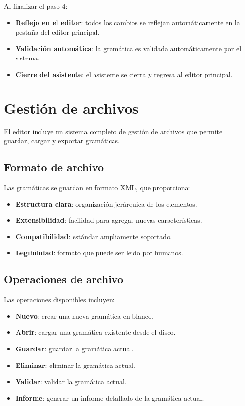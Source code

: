 Al finalizar el paso 4:

\begin{itemize}
    \item \textbf{Reflejo en el editor}: todos los cambios se reflejan automáticamente en la pestaña del editor principal.
    \item \textbf{Validación automática}: la gramática es validada automáticamente por el sistema.
    \item \textbf{Cierre del asistente}: el asistente se cierra y regresa al editor principal.
\end{itemize}

\section{Gestión de archivos}

El editor incluye un sistema completo de gestión de archivos que permite guardar, cargar y exportar gramáticas.

\subsection{Formato de archivo}

Las gramáticas se guardan en formato XML, que proporciona:

\begin{itemize}
    \item \textbf{Estructura clara}: organización jerárquica de los elementos.
    \item \textbf{Extensibilidad}: facilidad para agregar nuevas características.
    \item \textbf{Compatibilidad}: estándar ampliamente soportado.
    \item \textbf{Legibilidad}: formato que puede ser leído por humanos.
\end{itemize}

\subsection{Operaciones de archivo}

Las operaciones disponibles incluyen:

\begin{itemize}
    \item \textbf{Nuevo}: crear una nueva gramática en blanco.
    \item \textbf{Abrir}: cargar una gramática existente desde el disco.
    \item \textbf{Guardar}: guardar la gramática actual.
    \item \textbf{Eliminar}: eliminar la gramática actual.
    \item \textbf{Validar}: validar la gramática actual.
    \item \textbf{Informe}: generar un informe detallado de la gramática actual.
\end{itemize}

